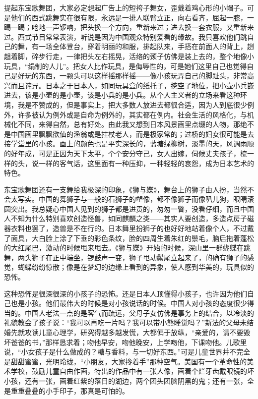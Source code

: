 \par 提起东宝歌舞团，大家必定想起广告上的短袴子舞女，歪戴着鸡心形的小帽子。可是他们的西式跳舞实在很有限，永远是一排人联臂立正，向右看齐，屈起一膝，一踢一踢；呛地一声锣响，把头换一个方向，重新来过；进去换一套衣服，又重新来过。西式节目常常表演，听说是因为中国观众特别爱看的缘故。我只喜欢他们跳自己的舞，有一场全体登台，穿着明丽的和服，排起队来，手搭在前面人的背上，趔趄着脚，碎步行走，一律把头左右摇晃，活络的颈子仿佛是装上去的，整个地像小玩具，“绢制的人儿”。把女人比作玩具，是侮辱性的，可是她们这里自己也觉得自己是好玩的东西，一颗头可以这样摇那样摇——像小孩玩弄自己的脚趾头，非常高兴而且诧异。日本之于日本人，如同玩具盒的纸托子，挖空了地位，把小壶小兵嵌进去，该是小壶的是小壶，该是小兵的是小兵。从个人主义者的立场来看这种环境，我是不赞成的，但是事实上，把大多数人放进去都很合适，因为人到底很少例外，许多被认为例外或是自命为例外的，其实都在例内。社会生活的风格化，与机械化不同，来得自然，总有好处。由此我又想到日本风景画里点缀的人物，那绝不是中国画里飘飘欲仙的渔翁或是拄杖老人，而是极家常的；过桥的妇女很可能是去接学堂里的小孩。画上的颜色也是平实深长的，蓝塘绿柳树，淡墨的天，风调雨顺的好年成，可是正因为天下太平，个个安分守己，女人出嫁，伺候丈夫孩子，梳一样的头，说一样的客气话，这里面有一种压抑，一种轻轻的哀怨，成为日本艺术的特色。
\par 东宝歌舞团还有一支舞给我极深的印象，《狮与蝶》，舞台上的狮子由人扮，当然不会太写实。中国的舞狮子与一般的石狮子的塑像，都不像狮子而像叭儿狗，眼睛滚圆突出。我总疑心中国人见到的狮子都是进贡的，匆匆一瞥，没看仔细，而且中国人不知为什么特别喜欢创造怪兽，如同麒麟之类——其实人要创造，多造点房子磁器衣料也罢了，造兽是不在行的。日本舞里扮狮子的也好好地站着像个人，不过戴了面具，大白脸上涂了下垂的彩色条纹，脸的四周生着朱红的鬃毛，脑后拖着蓬松的大红尾巴，激动的时候甩来甩去。《狮与蝶》开始的时候，深山里一群蝴蝶在跳舞，两头狮子在正中端坐，锣鼓声一变，狮子甩动鬃尾立起来了，的确有狮子的感觉，蝴蝶纷纷惊散；像是在梦幻的边缘上看到的异象，使人感到华美的，玩具似的恐怖。
\par 这种恐怖是很深很深的小孩子的恐怖。还是日本人顶懂得小孩子，也许因为他们自己也是小孩。他们最伟大的时候是对小孩说话的时候。中国人对小孩的态度很少得当的。中国人老法一点的是客气而疏远，父母子女仿佛是事务上的结合，以冷淡的礼貌教会了孩子说：“我可以再吃一片吗？我可以带小熊睡觉吗？”新法的父母未结婚先就攻读儿童心理学，研究得越多越发慌，大都偏于放纵，“亲爱的，请不要毁坏爸爸的书，”那样恳求着；吻他早安，吻他晚安，上学吻他，下课吻他。儿歌里说，“小女孩子是什么做成的？糖与香料，与一切好东西。”可是儿童世界并不完全是甜甜蜜蜜，光明玲珑，“小朋友，大家搀着手”那种空气。美国有一个革命性的美术学校，鼓励儿童自由作画，特出的作品中有一张人像，画着个烂牙齿戴眼镜的坏小孩，还有一张，画着红紫的落日的湖边，两个团头团脑阴黑的鬼；还有一张，全是重重叠叠的小手印子，那真是可怕的。
